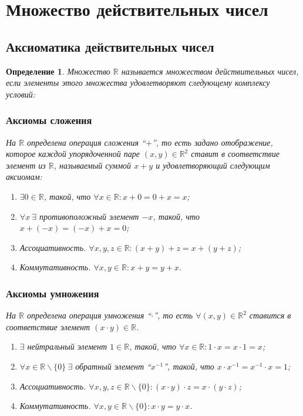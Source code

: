 \documentclass[a4paper,12pt]{article} %
\newtheorem{definition}{Определение}[section]
\theoremstyle{remark}
\theoremstyle{definition}
\begin{document}
\section{Множество действительных чисел}
\subsection{Аксиоматика действительных чисел}
\begin{definition}
	Множество $\mathbb{R}$ называется множеством действительных чисел, если элементы этого множества удовлетворяют следующему комплексу условий:
	\subsubsection*{Аксиомы сложения}
	На $\mathbb{R}$ определена операция сложения  ``$+$'', то есть задано отображение, которое каждой упорядоченной паре $(x, y)\in \mathbb{R}^2$ ставит в соответствие элемент из $\mathbb{R}$, называемый суммой $x+y$ и удовлетворяющий следующим аксиомам:
		\begin{enumerate}
			\item $\exists 0\in \mathbb{R}$, такой, что $\forall x\in \mathbb{R}:x+0=0+x=x$;
			\item $\forall x \ \exists$ противоположный элемент $-x$, такой, что $x+(-x)=(-x)+x=0$;
			\item Ассоциативность. $\forall x, y, z\in \mathbb{R}:(x+y)+z=x+(y+z)$;
			\item Коммутативность. $\forall x, y\in \mathbb{R}:x+y=y+x$.
		\end{enumerate}
	\subsubsection*{Аксиомы умножения}
	На $\mathbb{R}$ определена операция умножения ``$\cdot$'', то есть $\forall(x, y)\in\mathbb{R}^2$ ставится в соответствие элемент $(x\cdot y)\in \mathbb{R}$.
		\begin{enumerate}
			\item $\exists $ нейтральный элемент $1\in \mathbb{R}$, такой, что $\forall x\in \mathbb{R}:1\cdot x=x\cdot 1=x$;
			\item $\forall x\in \mathbb{R}\backslash\{0\} \ \exists $ обратный элемент ``$x^{-1}$'', такой, что $x\cdot x^{-1}=x^{-1}\cdot x=1$;
			\item Ассоциативность. $\forall x, y, z\in \mathbb{R}\backslash\{0\}:(x\cdot y)\cdot z=x\cdot (y\cdot z)$;
			\item Коммутативность. $\forall x, y\in \mathbb{R}\backslash\{0\}:x\cdot y=y\cdot x$.
		\end{enumerate}

\end{definition}
\end{document}
